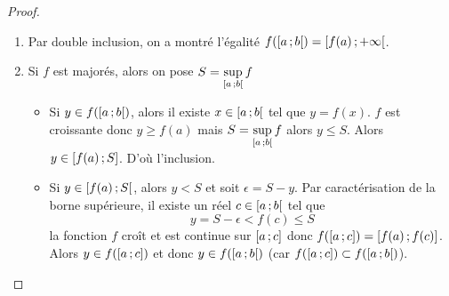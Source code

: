 \begin{proof}
  \begin{enumerate}
  \item
    Par double inclusion, on a montré l'égalité \(f(\left[ a \, ;  b \right[)=\left[ f(a) \, ;  +\infty \right[\).
  \item Si \(f\) est majorés, alors on pose \(S=\sup\limits_{\left[ a \, ;  b \right[}f\)
    \begin{itemize}
    \item Si \(y \in f(\left[ a \, ;  b \right[)\), alors il existe \(x \in \left[ a \, ;  b \right[\) tel que \(y=f(x)\). \(f\) est croissante donc \(y \geqslant f(a)\) mais \(S=\sup\limits_{\left[ a \, ;  b \right[}f\) alors \(y \leqslant S\). Alors \(y \in \left[ f(a) \, ;  S \right]\). D'où l'inclusion.
    \item Si \(y \in \left[ f(a) \, ;  S \right[\), alors \(y < S\) et soit \(\epsilon=S-y\). Par caractérisation de la borne supérieure, il existe un réel \(c \in \left[ a \, ;  b \right[\) tel que
      \begin{equation}
        y=S-\epsilon < f(c) \leqslant S
      \end{equation}
      la fonction \(f\) croît et est continue sur \(\left[ a \, ;  c \right]\) donc \(f(\left[ a \, ;  c \right])=\left[ f(a) \, ;  f(c) \right]\). Alors \(y \in f(\left[ a \, ;  c \right])\) et donc \(y \in f(\left[ a \, ;  b \right[)\) (car \(f(\left[ a \, ;  c \right]) \subset f(\left[ a \, ;  b \right[)\)).

\end{itemize}
\end{enumerate}
\end{proof}
